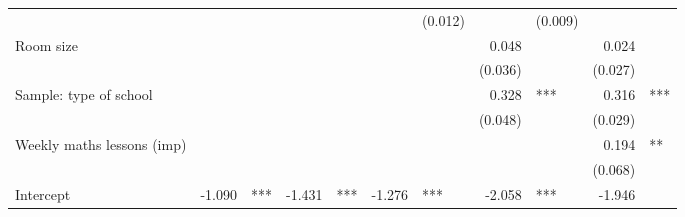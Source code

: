 \documentclass{article}
\begin{document}
\begin{table}[!h]
\begin{tabular}{lllllllllll}
  \multicolumn{1}{r}{} &
  \multicolumn{1}{l}{} &
  \multicolumn{1}{r}{} &
  \multicolumn{1}{l}{} &
  \multicolumn{1}{r}{} &
  \multicolumn{1}{l}{} &
  \multicolumn{1}{r}{(0.012)} &
  \multicolumn{1}{l}{} &
  \multicolumn{1}{r}{(0.009)} &
  \multicolumn{1}{l}{} \\
\multicolumn{1}{l}{Room size} &
  \multicolumn{1}{r}{} &
  \multicolumn{1}{l}{} &
  \multicolumn{1}{r}{} &
  \multicolumn{1}{l}{} &
  \multicolumn{1}{r}{} &
  \multicolumn{1}{l}{} &
  \multicolumn{1}{r}{0.048} &
  \multicolumn{1}{l}{} &
  \multicolumn{1}{r}{0.024} &
  \multicolumn{1}{l}{} \\
\multicolumn{1}{l}{} &
  \multicolumn{1}{r}{} &
  \multicolumn{1}{l}{} &
  \multicolumn{1}{r}{} &
  \multicolumn{1}{l}{} &
  \multicolumn{1}{r}{} &
  \multicolumn{1}{l}{} &
  \multicolumn{1}{r}{(0.036)} &
  \multicolumn{1}{l}{} &
  \multicolumn{1}{r}{(0.027)} &
  \multicolumn{1}{l}{} \\
\multicolumn{1}{l}{Sample: type of school} &
  \multicolumn{1}{r}{} &
  \multicolumn{1}{l}{} &
  \multicolumn{1}{r}{} &
  \multicolumn{1}{l}{} &
  \multicolumn{1}{r}{} &
  \multicolumn{1}{l}{} &
  \multicolumn{1}{r}{0.328} &
  \multicolumn{1}{l}{***} &
  \multicolumn{1}{r}{0.316} &
  \multicolumn{1}{l}{***} \\
\multicolumn{1}{l}{} &
  \multicolumn{1}{r}{} &
  \multicolumn{1}{l}{} &
  \multicolumn{1}{r}{} &
  \multicolumn{1}{l}{} &
  \multicolumn{1}{r}{} &
  \multicolumn{1}{l}{} &
  \multicolumn{1}{r}{(0.048)} &
  \multicolumn{1}{l}{} &
  \multicolumn{1}{r}{(0.029)} &
  \multicolumn{1}{l}{} \\
\multicolumn{1}{l}{Weekly maths lessons (imp)} &
  \multicolumn{1}{r}{} &
  \multicolumn{1}{l}{} &
  \multicolumn{1}{r}{} &
  \multicolumn{1}{l}{} &
  \multicolumn{1}{r}{} &
  \multicolumn{1}{l}{} &
  \multicolumn{1}{r}{} &
  \multicolumn{1}{l}{} &
  \multicolumn{1}{r}{0.194} &
  \multicolumn{1}{l}{**} \\
\multicolumn{1}{l}{} &
  \multicolumn{1}{r}{} &
  \multicolumn{1}{l}{} &
  \multicolumn{1}{r}{} &
  \multicolumn{1}{l}{} &
  \multicolumn{1}{r}{} &
  \multicolumn{1}{l}{} &
  \multicolumn{1}{r}{} &
  \multicolumn{1}{l}{} &
  \multicolumn{1}{r}{(0.068)} &
  \multicolumn{1}{l}{} \\
\multicolumn{1}{l}{Intercept} &
  \multicolumn{1}{r}{-1.090} &
  \multicolumn{1}{l}{***} &
  \multicolumn{1}{r}{-1.431} &
  \multicolumn{1}{l}{***} &
  \multicolumn{1}{r}{-1.276} &
  \multicolumn{1}{l}{***} &
  \multicolumn{1}{r}{-2.058} &
  \multicolumn{1}{l}{***} &
  \multicolumn{1}{r}{-1.946} &

\end{tabular}
\end{table}
\end{document}
